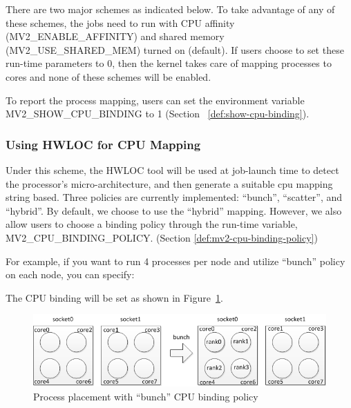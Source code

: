 There are two major schemes
as indicated below. To take advantage of any of these
schemes, the jobs need to run with CPU
affinity (MV2\_ENABLE\_AFFINITY) and shared memory \\
(MV2\_USE\_SHARED\_MEM) turned on (default). If users choose to set
these run-time parameters to 0, then the kernel takes care of mapping processes to
cores and none of these schemes will be enabled.

To report the process mapping, users can set the environment
variable MV2\_SHOW\_CPU\_BINDING to 1 (Section ~\ref{def:show-cpu-binding}).


\subsubsection{Using HWLOC for CPU Mapping}
\label{usage:mv2_use_hwloc_cpu_binding}

Under this scheme, the HWLOC tool will be used at job-launch
time to detect the processor's micro-architecture, and then generate
a suitable cpu mapping string based.
Three policies are currently implemented: ``bunch'', ``scatter'', and ``hybrid''.
By default, we choose to use the ``hybrid'' mapping. However, we also
allow users to choose a binding policy through the run-time variable,
MV2\_CPU\_BINDING\_POLICY.
(Section \ref{def:mv2-cpu-binding-policy})

For example, if you want to run 4 processes per node and utilize ``bunch''
policy on each node, you can specify:


The CPU binding will be set as shown in Figure~\ref{fig:bunch}.

\begin{figure}[htbp]
 \centering
 \includegraphics[width=0.9\columnwidth]{Img/nehalem-bunch.png}
 \caption{Process placement with ``bunch'' CPU binding policy}
 \label{fig:bunch}
\end{figure}

